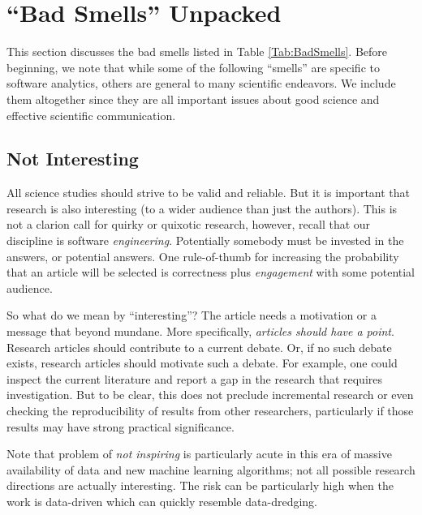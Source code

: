 \documentclass[10pt]{elsarticle}
\begin{document}
 
\section{``Bad Smells'' Unpacked}\label{Sec:BadSmells}
This section discusses the bad smells listed in Table \ref{Tab:BadSmells}.
Before beginning, we note that while some of the following ``smells'' are specific to software analytics, others are general to many scientific endeavors.  We include them altogether since they are all important issues about good science and effective scientific communication.


\subsection{Not Interesting}

All science studies should strive to be valid and reliable. But it is important that research is also interesting (to a wider audience than just the authors).  This is not a clarion call for quirky or quixotic research, however, recall that our discipline is software \textit{engineering}. Potentially somebody must be invested in the answers, or potential answers.  One rule-of-thumb for increasing the probability that an article will be selected is correctness plus {\em engagement} with some potential audience. 


So what do we mean by ``interesting''?  The article needs a motivation or a message that beyond mundane.  More specifically, {\em articles should have a point}. Research articles should contribute to a current debate. Or, if no such debate exists, research articles should motivate such a debate.  For example, one could inspect the current literature and report a gap in the research that requires investigation.  But to be clear, this does not preclude incremental research or even checking the reproducibility of results from other researchers, particularly if those results may have strong practical significance.

Note that problem of {\em not inspiring} is particularly acute in this era of massive availability of data and new machine learning algorithms; not all possible research directions are actually interesting.  The risk can be particularly high when the work is data-driven which can quickly resemble data-dredging.
\end{document}
